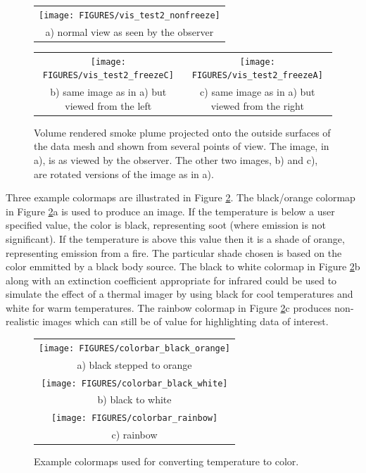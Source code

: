 {\begin{figure}[\figoptions]
\begin{center}
\begin{tabular}{c}
\texttt{[image: FIGURES/vis\_test2\_nonfreeze]}\\
a) normal view as seen by the observer
\end{tabular}
\begin{tabular}{cc}
\texttt{[image: FIGURES/vis\_test2\_freezeC]}&
\texttt{[image: FIGURES/vis\_test2\_freezeA]}\\
b) same image as in a) but viewed from the left&c) same image as in a) but viewed from the right\\
\end{tabular}
\end{center}
\caption[Volume rendered smoke plume shown from several points of view.]{Volume rendered smoke plume projected onto the outside surfaces of the data mesh and shown  from several points of view.
The image, in a), is as viewed by the observer.  The other two images, b) and c), are rotated versions of the image as in a).
}
\label{fig:volplume_example}
\end{figure}

Three example colormaps  are illustrated in Figure \ref{fig:colormaps}.  
The black/orange colormap in Figure \ref{fig:colormaps}a 
is used to produce an image.  If the temperature is below a user specified value, the color is black, representing soot (where emission is not significant).  If the temperature is above this value then it is a shade of orange, representing emission from a fire.  The particular shade chosen is based on the color emmitted by a black body source.  
The black to white colormap in Figure \ref{fig:colormaps}b along with an extinction coefficient appropriate for infrared could be used to simulate the effect of a thermal imager by using black for cool temperatures and white for warm temperatures.  
The rainbow colormap in Figure \ref{fig:colormaps}c produces non-realistic images which can still be of value for highlighting data of interest.

\begin{figure}[\figoptions]
\begin{center}
\begin{tabular}{c}
\texttt{[image: FIGURES/colorbar\_black\_orange]}\\
a) black stepped to orange\\
\texttt{[image: FIGURES/colorbar\_black\_white]}\\
b) black to white\\
\texttt{[image: FIGURES/colorbar\_rainbow]}\\
c) rainbow
\end{tabular}
\end{center}
\caption[Example colormaps used for converting temperature to color.]
{Example colormaps used for converting temperature to color.}
\label{fig:colormaps}
\end{figure}

}
